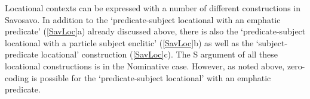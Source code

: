 
Locational contexts can be expressed with a number of different constructions in Savosavo. 
In addition to the `predicate-subject locational with an emphatic predicate' (\ref{SavLoc}a) already discussed above, there is also the `predicate-subject locational with a particle subject enclitic' (\ref{SavLoc}b) as well as the `subject-predicate locational' construction (\ref{SavLoc}c). 
The S argument of all these locational constructions is in the Nominative case. However, as noted above, zero-coding is possible for the `predicate-subject locational' with an emphatic predicate. %

